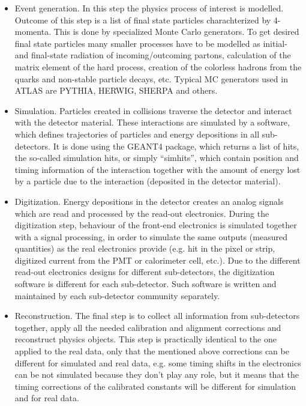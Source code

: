 \begin{itemize}
 \item Event generation. In this step the physics process of interest is modelled. Outcome of this step is a list of final state particles charachterized by 4-momenta. 
This is done by specialized Monte Carlo generators. To get desired final state particles many smaller processes have to be modelled as initial- and final-state radiation 
of incoming/outcoming partons, calculation of the matrix element of the hard process, creation of the colorless hadrons from the quarks and non-stable particle decays, etc. 
Typical MC generators used in ATLAS
 are PYTHIA, HERWIG, SHERPA and others.
 \item Simulation. Particles created in collisions traverse the detector and interact with the detector material. These interactions are simulated by a software, which defines trajectories of particles and energy depositions in all sub-detectors. 
 It is done using the GEANT4 package, which returns a list of hits, the so-called simulation hits, or simply ``simhits'', which contain position and timing information of 
 the interaction together with the amount of energy lost by a particle due to the interaction (deposited in the detector material).
 \item Digitization. Energy depositions in the detector creates an analog signals which are read and processed by the read-out electronics. During the digitization step, behaviour of the front-end electronics is simulated together with a signal processing, in order to simulate the same outputs (measured quantities) as the real electronics provide (e.g. hit in the pixel or strip,
 digitized current from the PMT or calorimeter cell, etc.). Due to the different read-out electronics designs for different sub-detectors, the digitization software is different for each sub-detector.
 Such software is written and maintained by each sub-detector community separately.
 \item Reconstruction. The final step is to collect all information from sub-detectors together, apply all the needed calibration and alignment corrections and reconstruct physics objects. This step is practically identical to the one applied to the real data, only that the mentioned above corrections can be different for simulated and real 
 data, e.g. some timing shifts in the electronics can be not simulated because they don't play any role, but it means that the timing corrections of the calibrated constants will be different for simulation and for real data.
\end{itemize}

